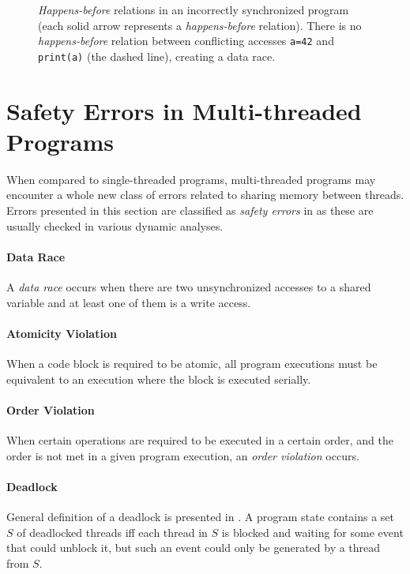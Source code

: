 \begin{figure}[hbt]
    \label{hb2}
    
    \caption{\emph{Happens-before} relations in an incorrectly synchronized
    program (each solid arrow represents a \emph{happens-before} relation).
    There is no \emph{happens-before} relation between conflicting accesses
    \texttt{a=42} and \texttt{print(a)} (the dashed line), creating a data race.}
\end{figure}


\section{Safety Errors in Multi-threaded Programs}

When compared to single-threaded programs, multi-threaded programs may encounter
a whole new class of errors related to sharing memory between threads. Errors
presented in this section are classified as \emph{safety errors} in \cite{letko}
as these are usually checked in various dynamic analyses.

\paragraph{Data Race}
A \emph{data race} occurs when there are two unsynchronized accesses to a shared
variable and at least one of them is a write access.

\paragraph{Atomicity Violation}
When a code block is required to be atomic, all
program executions must be equivalent to an execution where the block is
executed serially.

\paragraph{Order Violation}
When certain operations are required to be executed
in a certain order, and the order is not met in a given program execution, an
\emph{order violation} occurs.

\paragraph{Deadlock}
General definition of a deadlock is presented in
\cite{letko}. A program state contains a set $S$ of deadlocked threads iff each
thread in $S$ is blocked and waiting for some event that could unblock it, but
such an event could only be generated by a thread from $S$.

